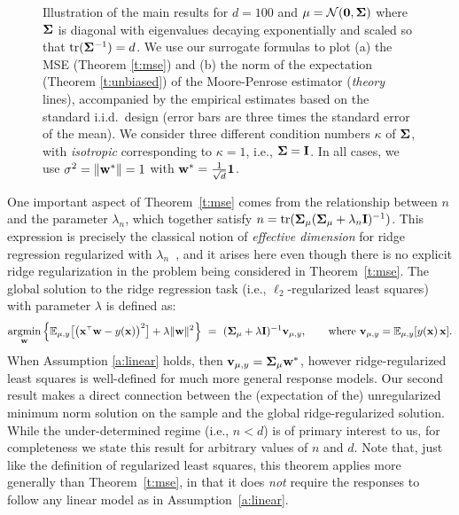\documentclass[11pt]{article}
\begin{document}
\begin{figure}[h]
\caption{Illustration of the main results for $d=100$ and
$\mu=\mathcal{N}(\mathbf 0,\mathbf{\Sigma})$ where $\mathbf{\Sigma}$ is diagonal with
eigenvalues decaying exponentially and scaled so that
$\mathrm{tr}(\mathbf{\Sigma}^{-1})=d$. We use our surrogate
formulas to plot (a) the MSE (Theorem \ref{t:mse}) and (b) the norm of the expectation (Theorem
\ref{t:unbiased}) of the Moore-Penrose estimator (\emph{theory}
lines), accompanied by the empirical estimates based on the standard
i.i.d.~design (error bars are three times the standard error of the
mean). We consider three different condition numbers $\kappa$ of
$\mathbf{\Sigma}$, with \emph{isotropic} corresponding to $\kappa=1$,
i.e., $\mathbf{\Sigma}=\mathbf I$. In all cases, we use $\sigma^2=\|\mathbf w^*\|=1$ with
$\mathbf w^*=\frac1{\sqrt{d}}\mathbf 1$.}
\label{f:intro}
\end{figure}

One important aspect of Theorem~\ref{t:mse} comes from the relationship between $n$ and the parameter $\lambda_n$, which together satisfy $n=\mathrm{tr}(\mathbf{\Sigma}_\mu (\mathbf{\Sigma}_\mu+\lambda_n\mathbf I)^{-1})$. 
This expression is precisely the classical notion of \emph{effective dimension} for ridge regression regularized with $\lambda_n$~\cite{Alaoui15}, and it arises here even though there is no explicit ridge regularization in the problem being considered in Theorem~\ref{t:mse}. 
The global solution to the ridge regression task (i.e., $\ell_2$-regularized
least squares) with parameter $\lambda$ is defined as: 
\begin{align*}
\argmin_\w \Big\{\E_{\mu,y}\big[\big(\x^\top\w-y(\x)\big)^2\big]
    + \lambda\|\w\|^2\Big\}\ =\ (\Sigmab_\mu +
  \lambda\I)^{-1}\v_{\mu,y},\qquad\text{where } \v_{\mu,y}=\E_{\mu,y}[y(\x)\,\x ].
\end{align*}
When Assumption \ref{a:linear} holds, then
$\mathbf v_{\mu,y}=\mathbf{\Sigma}_\mu\mathbf w^*$, however ridge-regularized least squares
is well-defined for much more general response models.
Our second result makes a direct connection between the (expectation
of the) unregularized minimum norm solution on the sample
and the global ridge-regularized solution.
While the under-determined regime (i.e., $n<d$) is of primary interest to us, 
for completeness we state this result for arbitrary values of $n$ and $d$.
Note that, just like the definition of regularized least squares, this
theorem applies more generally than Theorem~\ref{t:mse}, in that it
does \emph{not} require the responses to follow any linear model as in Assumption~\ref{a:linear}.  
\end{document}
